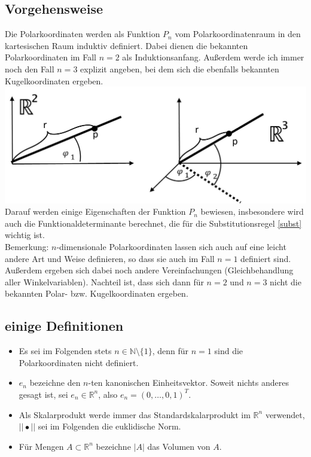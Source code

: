 \documentclass[a4paper,11pt]{scrartcl}
\newcommand{\R}{{\ensuremath{\mathbb{R}}}}
\newcommand{\N}{{\ensuremath{\mathbb{N}}}}
\begin{document}
\subsection{Vorgehensweise}
Die Polarkoordinaten werden als Funktion $P_n$ vom \glqq Polarkoordinatenraum\grqq{} in den kartesischen Raum induktiv definiert. Dabei dienen die bekannten Polarkoordinaten im Fall $n=2$ als Induktionsanfang. Außerdem werde ich immer noch den Fall $n=3$ explizit angeben, bei dem sich die ebenfalls bekannten Kugelkoordinaten ergeben.\\
\includegraphics[scale=0.5]{images/PolarKugelkoordinaten.jpg}\\
Darauf werden einige Eigenschaften der Funktion $P_n$ bewiesen, insbesondere wird auch die Funktionaldeterminante berechnet, die für die Substitutionsregel \eqref{subst}
wichtig ist.\\
Bemerkung: $n$-dimensionale Polarkoordinaten lassen sich auch auf eine leicht andere Art und Weise definieren, so dass sie auch im Fall $n=1$ definiert sind. Außerdem ergeben sich dabei noch andere Vereinfachungen (Gleichbehandlung aller Winkelvariablen). Nachteil ist, dass sich dann für $n=2$ und $n=3$ nicht die bekannten Polar- bzw. Kugelkoordinaten ergeben.
\subsection{einige Definitionen}
\begin{itemize}
\item Es sei im Folgenden stets $n\in\N\setminus\{1\}$, denn für $n=1$ sind die Polarkoordinaten nicht definiert.
\item $e_n$ bezeichne den $n$-ten kanonischen Einheitsvektor. Soweit nichts anderes gesagt ist, sei $e_n\in\R^n$, also $e_n=(0,\ldots,0,1)^T$.
\item Als Skalarprodukt werde immer das Standardskalarprodukt im $\R^n$ verwendet, $||\bullet||$ sei im Folgenden die euklidische Norm.
\item Für Mengen $A\subset \R^n$ bezeichne $|A|$ das Volumen von $A$.
\end{itemize}
\end{document}
